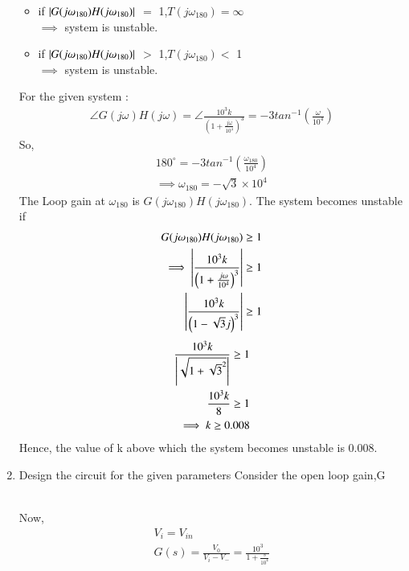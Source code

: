 \begin{enumerate}[label=\thesection.\arabic*.,ref=\thesection.\theenumi]
\begin{itemize}
    \item if $\left\vert{G(j\omega_{180})H(j\omega_{180})}\right\vert$ $=$ 1,$T(j\omega_{180}) = \infty $ \\ $\implies$
    system is unstable.
    \item if $\left\vert{G(j\omega_{180})H(j\omega_{180})}\right\vert$ $>$ 1,$T(j\omega_{180}) <$ 1 \\ $\implies$ 
    system is unstable.
\end{itemize}
For the given system :
\begin{align}
   \angle G(j\omega)H(j\omega) =  \angle\frac{10^3k}{\left(1+\frac{j\omega}{10^4}\right)^3} 
   = -3tan^{-1}\left({\frac{\omega}{10^4}}\right)
\end{align}
So,
\begin{align}
   180^{\circ}=  -3tan^{-1}\left({\frac{\omega_{180}}{10^4}}\right)\\
   \implies \omega_{180} = -\sqrt{3}\times 10^4
\end{align}
The Loop gain at $\omega_{180}$ is $G(j\omega_{180})H(j\omega_{180})$.
 The system becomes unstable if 
\begin{align}
G(j\omega_{180})H(j\omega_{180})\geq 1 \\
\implies \left\vert\frac{10^3k}{\left(1+\frac{j\omega}{10^4}\right)^3}\right\vert \geq 1\\
\left\vert\frac{10^3k}{\left(1-\sqrt{3}j\right)^3} \right\vert \geq 1
\end{align}
\begin{align}
     \frac{10^3k}{\left\vert\sqrt{1+{\sqrt{3}}^2}\right\vert} \geq 1\\
     \frac{10^3k}{8} \geq 1 \\
     \implies k \geq 0.008
\end{align}
Hence, the value of k above which the system becomes unstable is 0.008. 
\item Design the circuit for the given parameters
\solution Consider the open loop gain,G \newline
\begin{figure}[!ht]
	\begin{center}
		\resizebox{\columnwidth}{!}{}
	\end{center}
\caption{}
\label{fig:ee18btech11006_4}
\end{figure} \\
Now, 
\begin{align}
V_i=V_{in}\\
G(s)=\frac{V_0}{V_i-V_-}= \frac{10^3}{1+\frac{s}{10^4}}
\end{align}

\end{enumerate}
